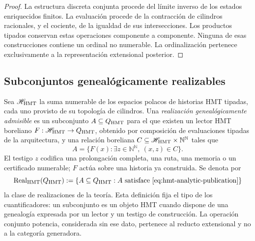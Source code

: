 \begin{proof}
La estructura discreta conjunta procede del l\'imite inverso de los estados
enriquecidos finitos. La evaluaci\'on procede de la contracci\'on de
cilindros racionales, y el cociente, de la igualdad de sus intersecciones.
Los productos tipados conservan estas operaciones componente a componente.
Ninguna de esas construcciones contiene un ordinal no numerable. La
ordinalizaci\'on pertenece exclusivamente a la representaci\'on extensional
posterior.
\end{proof}

\subsection{Subconjuntos geneal\'ogicamente realizables}

Sea \(\mathscr H_{\rm HMT}\) la suma numerable de los espacios polacos de
historias HMT tipadas, cada uno provisto de su topolog\'ia de cilindros. Una
\emph{realizaci\'on geneal\'ogicamente admisible} es un subconjunto
\(A\subseteq Q_{\rm HMT}\) para el que existen un lector HMT boreliano
\(F:\mathscr H_{\rm HMT}\to Q_{\rm HMT}\), obtenido por composici\'on de
evaluaciones tipadas de la arquitectura, y una relaci\'on boreliana
\(C\subseteq\mathscr H_{\rm HMT}\times\mathbb N^{\mathbb N}\) tales que
\begin{equation}
 A=\{F(x):\exists z\in\mathbb N^{\mathbb N},\ (x,z)\in C\}.
 \label{eq:hmt-analytic-publication}
\end{equation}
El testigo \(z\) codifica una prolongaci\'on completa, una ruta, una memoria
o un certificado numerable; \(F\) act\'ua sobre una historia ya construida.
Se denota por
\begin{equation}
 \operatorname{Real}_{\rm HMT}(Q_{\rm HMT})
 :=\{A\subseteq Q_{\rm HMT}:A\text{ satisface }
 \eqref{eq:hmt-analytic-publication}\}
 \label{eq:clase-realizaciones-genealogicas}
\end{equation}
la clase de realizaciones de la teor\'ia. Esta definici\'on fija el tipo de
los cuantificadores: un subconjunto es un objeto HMT cuando dispone de una
genealog\'ia expresada por un lector y un testigo de construcci\'on. La
operaci\'on conjunto potencia, considerada sin ese dato, pertenece al reducto
extensional y no a la categor\'ia generadora.

